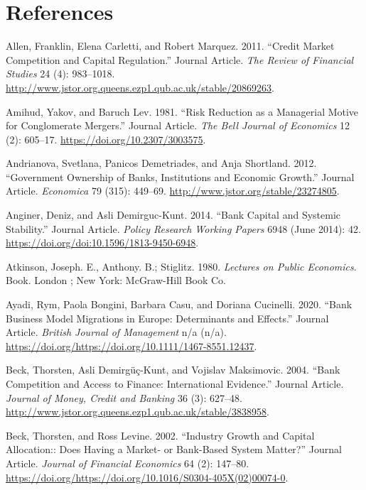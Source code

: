 \documentclass{article}
\begin{document}
\hypertarget{references}{%
\section*{References}\label{references}}

\hypertarget{refs}{}
\leavevmode\hypertarget{ref-RN15}{}%
Allen, Franklin, Elena Carletti, and Robert Marquez. 2011. ``Credit
Market Competition and Capital Regulation.'' Journal Article. \emph{The
Review of Financial Studies} 24 (4): 983--1018.
\url{http://www.jstor.org.queens.ezp1.qub.ac.uk/stable/20869263}.

\leavevmode\hypertarget{ref-RN16}{}%
Amihud, Yakov, and Baruch Lev. 1981. ``Risk Reduction as a Managerial
Motive for Conglomerate Mergers.'' Journal Article. \emph{The Bell
Journal of Economics} 12 (2): 605--17.
\url{https://doi.org/10.2307/3003575}.

\leavevmode\hypertarget{ref-RN17}{}%
Andrianova, Svetlana, Panicos Demetriades, and Anja Shortland. 2012.
``Government Ownership of Banks, Institutions and Economic Growth.''
Journal Article. \emph{Economica} 79 (315): 449--69.
\url{http://www.jstor.org/stable/23274805}.

\leavevmode\hypertarget{ref-RN18}{}%
Anginer, Deniz, and Asli Demirguc-Kunt. 2014. ``Bank Capital and
Systemic Stability.'' Journal Article. \emph{Policy Research Working
Papers} 6948 (June 2014): 42.
\url{https://doi.org/doi:10.1596/1813-9450-6948}.

\leavevmode\hypertarget{ref-RN20}{}%
Atkinson, Joseph. E., Anthony. B.; Stiglitz. 1980. \emph{Lectures on
Public Economics}. Book. London ; New York: McGraw-Hill Book Co.

\leavevmode\hypertarget{ref-RN21}{}%
Ayadi, Rym, Paola Bongini, Barbara Casu, and Doriana Cucinelli. 2020.
``Bank Business Model Migrations in Europe: Determinants and Effects.''
Journal Article. \emph{British Journal of Management} n/a (n/a).
\url{https://doi.org/https://doi.org/10.1111/1467-8551.12437}.

\leavevmode\hypertarget{ref-RN22}{}%
Beck, Thorsten, Asli Demirgüç-Kunt, and Vojislav Maksimovic. 2004.
``Bank Competition and Access to Finance: International Evidence.''
Journal Article. \emph{Journal of Money, Credit and Banking} 36 (3):
627--48.
\url{http://www.jstor.org.queens.ezp1.qub.ac.uk/stable/3838958}.

\leavevmode\hypertarget{ref-RN23}{}%
Beck, Thorsten, and Ross Levine. 2002. ``Industry Growth and Capital
Allocation:: Does Having a Market- or Bank-Based System Matter?''
Journal Article. \emph{Journal of Financial Economics} 64 (2): 147--80.
\url{https://doi.org/https://doi.org/10.1016/S0304-405X(02)00074-0}.
\end{document}
